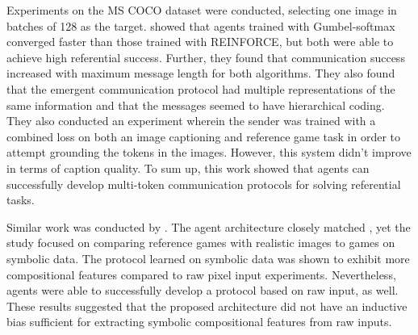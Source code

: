 Experiments on the MS COCO dataset were conducted, selecting one image in batches of 128 as the target. \cite{havrylov2017emergence} showed that agents trained with Gumbel-softmax converged faster than those trained with REINFORCE, but both were able to achieve high referential success. Further, they found that communication success increased with maximum message length for both algorithms. They also found that the emergent communication protocol had multiple representations of the same information and that the messages seemed to have hierarchical coding. They also conducted an experiment wherein the sender was trained with a combined loss on both an image captioning and reference game task in order to attempt grounding the tokens in the images. However, this system didn't improve in terms of caption quality. To sum up, this work showed that agents can successfully develop multi-token communication protocols for solving referential tasks.

Similar work was conducted by \cite{lazaridou2018emergence}. The agent architecture closely matched \cite{havrylov2017emergence}, yet the study focused on comparing reference games with realistic images to games on symbolic data. The protocol learned on symbolic data was shown to exhibit more compositional features compared to raw pixel input experiments. Nevertheless, agents were able to successfully develop a protocol based on raw input, as well. These results suggested that the proposed architecture did not have an inductive bias sufficient for extracting symbolic compositional features from raw inputs. 

